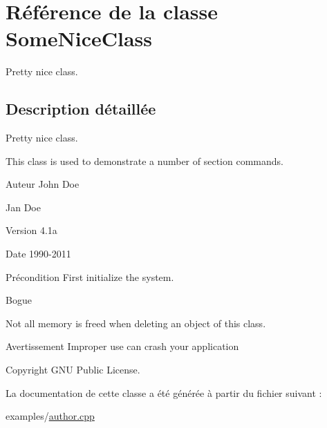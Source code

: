 \hypertarget{class_some_nice_class}{}\section{Référence de la classe Some\+Nice\+Class}
\label{class_some_nice_class}


Pretty nice class.  




\subsection{Description détaillée}
Pretty nice class. 

This class is used to demonstrate a number of section commands. \begin{DoxyAuthor}{Auteur}
John Doe 

Jan Doe 
\end{DoxyAuthor}
\begin{DoxyVersion}{Version}
4.\+1a 
\end{DoxyVersion}
\begin{DoxyDate}{Date}
1990-\/2011 
\end{DoxyDate}
\begin{DoxyPrecond}{Précondition}
First initialize the system. 
\end{DoxyPrecond}
\begin{DoxyRefDesc}{Bogue}
\item[\hyperlink{bug__bug000001}{Bogue}]Not all memory is freed when deleting an object of this class. \begin{DoxyWarning}{Avertissement}
Improper use can crash your application 
\end{DoxyWarning}
\begin{DoxyCopyright}{Copyright}
G\+N\+U Public License. 
\end{DoxyCopyright}
\end{DoxyRefDesc}


La documentation de cette classe a été générée à partir du fichier suivant \+:\begin{DoxyCompactItemize}
\item 
examples/\hyperlink{author_8cpp}{author.\+cpp}\end{DoxyCompactItemize}
